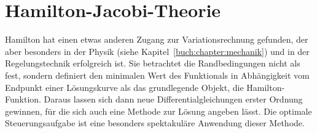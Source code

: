 %
%
%
\chapter{Hamilton-Jacobi-Theorie
\label{buch:chapter:hamiltonjacobi}}
Hamilton hat einen etwas anderen Zugang zur Variationsrechnung
gefunden, der aber besonders in der Physik (siehe
Kapitel~\ref{buch:chapter:mechanik}) und in der Regelungstechnik
erfolgreich ist.
Sie betrachtet die Randbedingungen nicht als fest, sondern definiert
den minimalen Wert des Funktionals in Abhängigkeit vom Endpunkt einer
Lösungskurve als das grundlegende Objekt, die Hamilton-Funktion.
Daraus lassen sich dann neue Differentialgleichungen erster Ordnung
gewinnen, für die sich auch eine Methode zur Lösung angeben lässt.
Die optimale Steuerungsaufgabe ist eine besonders spektakuläre 
Anwendung dieser Methode.







